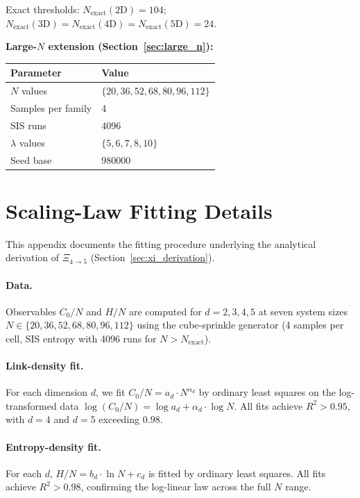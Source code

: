 \documentclass[12pt,a4paper]{article}
\begin{document}
Exact thresholds: $N_\text{exact}(\text{2D}) = 104$;
$N_\text{exact}(\text{3D}) = N_\text{exact}(\text{4D}) = N_\text{exact}(\text{5D}) = 24$.

\medskip

\textbf{Large-$N$ extension (Section~\ref{sec:large_n}):}
\begin{center}
\begin{tabular}{@{}ll@{}}
\toprule
Parameter & Value \\
\midrule
$N$ values & $\{20, 36, 52, 68, 80, 96, 112\}$ \\
Samples per family & 4 \\
SIS runs & 4096 \\
$\lambda$ values & $\{5, 6, 7, 8, 10\}$ \\
Seed base & 980000 \\
\bottomrule
\end{tabular}
\end{center}


\section{Scaling-Law Fitting Details}
\label{app:fitting_details}

This appendix documents the fitting procedure underlying the analytical derivation
of $\Xi_{4 \to 5}$ (Section~\ref{sec:xi_derivation}).

\paragraph{Data.}
Observables $C_0/N$ and $H/N$ are computed for $d = 2, 3, 4, 5$ at seven system sizes
$N \in \{20, 36, 52, 68, 80, 96, 112\}$ using the cube-sprinkle generator (4 samples per cell,
SIS entropy with 4096 runs for $N > N_\text{exact}$).

\paragraph{Link-density fit.}
For each dimension $d$, we fit $C_0/N = a_d \cdot N^{\alpha_d}$ by ordinary least squares
on the log-transformed data $\log(C_0/N) = \log a_d + \alpha_d \cdot \log N$.
All fits achieve $R^2 > 0.95$, with $d = 4$ and $d = 5$ exceeding $0.98$.

\paragraph{Entropy-density fit.}
For each $d$, $H/N = b_d \cdot \ln N + c_d$ is fitted by ordinary least squares.
All fits achieve $R^2 > 0.98$, confirming the log-linear law across the full $N$ range.
\end{document}
